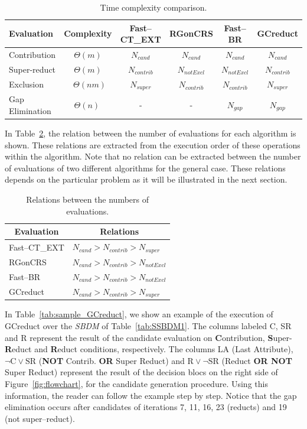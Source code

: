 \documentclass[number,preprint,review,12pt]{elsarticle}
\begin{document}
	\begin{table}[htb]
		\small
		\caption{Time complexity comparison.}
		\centering \label{tab:complexity}
		\begin{tabular}{|l|c|c|c|c|c|}
			\hline 
			Evaluation & Complexity & Fast--CT\_EXT & RGonCRS & Fast--BR & GCreduct\\
			\hline
			Contribution    & $\Theta(m)$  & $N_{cand}$ & $N_{cand}$ & $N_{cand}$ & $N_{cand}$ \\
			Super-reduct    & $\Theta(m)$  & $N_{contrib}$ & $N_{notExcl}$ & $N_{notExcl}$ & $N_{contrib}$ \\
			Exclusion       & $~~\Theta(nm)$ & $N_{super}$ & $N_{contrib}$ & $N_{contrib}$ & $N_{super}$ \\
			Gap Elimination & $\Theta(n)~$  & - & - & $N_{gap}$ & $N_{gap}$ \\
			\hline
		\end{tabular}             
	\end{table}  
	
	In Table~\ref{tab:order}, the relation between the number of evaluations for each algorithm is shown. These relations are extracted from the execution order of these operations within the algorithm. Note that no relation can be extracted between the number of evaluations of two different algorithms for the general case. These relations depends on the particular problem as it will be illustrated in the next section.
	
	\begin{table}[htb]
		\small
		\caption{Relations between the numbers of evaluations.}
		\centering \label{tab:order}
		\begin{tabular}{|l|l|}
			\hline 
			\multicolumn{1}{|c|}{Evaluation} & \multicolumn{1}{c|}{Relations}\\
			\hline
			Fast--CT\_EXT & $N_{cand} > N_{contrib} > N_{super}$ \\
			RGonCRS       & $N_{cand} > N_{contrib} > N_{notExcl}$ \\
			Fast--BR      & $N_{cand} > N_{contrib} > N_{notExcl} $ \\
			GCreduct      & $N_{cand} > N_{contrib} > N_{super}$ \\
			\hline
		\end{tabular}             
	\end{table} 
	
	In Table~\ref{tab:sample_GCreduct}, we show an example of the execution of GCreduct over the \textit{SBDM} of Table~\ref{tab:SSBDM1}. The columns labeled C, SR and R represent the result of the candidate evaluation on \textbf{C}ontribution, \textbf{S}uper-\textbf{R}educt and \textbf{R}educt conditions, respectively. The columns LA (Last Attribute), $\neg \mathrm{C} \vee \mathrm{SR}$ (\textbf{NOT} Contrib. \textbf{OR} Super Reduct) and $\mathrm{R} \vee \neg \mathrm{SR}$ (Reduct \textbf{OR NOT} Super Reduct) represent the result of the decision blocs on the right side of Figure~\ref{fig:flowchart}, for the candidate generation procedure. Using this information, the reader can follow the example step by step. Notice that the gap elimination occurs after candidates of iterations 7, 11, 16, 23 (reducts) and 19 (not super--reduct).
\end{document}
